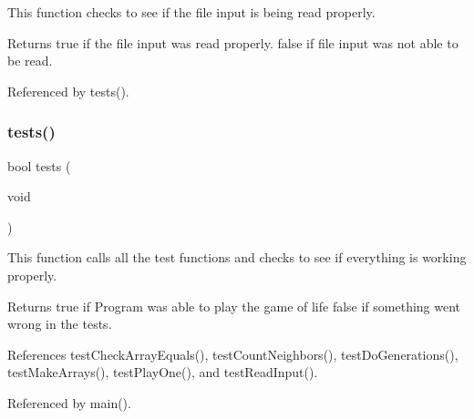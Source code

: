 This function checks to see if the file input is being read properly. \begin{DoxyReturn}{Returns}
true if the file input was read properly. false if file input was not able to be read. 
\end{DoxyReturn}


Referenced by tests().

\mbox{\label{tests_8h_a5e6e6e78df62797046c9ea173550a68a}} 
\subsubsection{tests()}
{\footnotesize\ttfamily bool tests (\begin{DoxyParamCaption}\item[{void}]{ }\end{DoxyParamCaption})}

This function calls all the test functions and checks to see if everything is working properly. \begin{DoxyReturn}{Returns}
true if Program was able to play the game of life false if something went wrong in the tests. 
\end{DoxyReturn}


References test\+Check\+Array\+Equals(), test\+Count\+Neighbors(), test\+Do\+Generations(), test\+Make\+Arrays(), test\+Play\+One(), and test\+Read\+Input().



Referenced by main().

